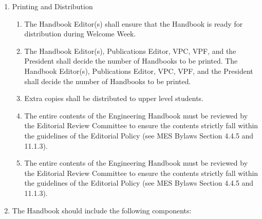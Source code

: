 \begin{enumerate}
 \item
  Printing and Distribution

  \begin{enumerate}
   \item
    The Handbook Editor(s) shall ensure that the Handbook is ready for distribution during Welcome Week.
   \item
    The Handbook Editor(s), Publications Editor, VPC, VPF, and the President shall decide the number of Handbooks to be printed. 
    The Handbook Editor(s), Publications Editor, VPC, VPF, and the President shall decide the number of Handbooks to be printed. 
   \item
    Extra copies shall be distributed to upper level students.
   \item     
    The entire contents of the Engineering Handbook must be reviewed by the Editorial Review Committee to ensure the contents strictly fall within the guidelines of the Editorial Policy (see MES Bylaws Section 4.4.5 and 11.1.3). 
   \item     
    The entire contents of the Engineering Handbook must be reviewed by the Editorial Review Committee to ensure the contents strictly fall within the guidelines of the Editorial Policy (see MES Bylaws Section 4.4.5 and 11.1.3). 
  \end{enumerate}
 \item
  The Handbook should include the following components:


\end{enumerate}
